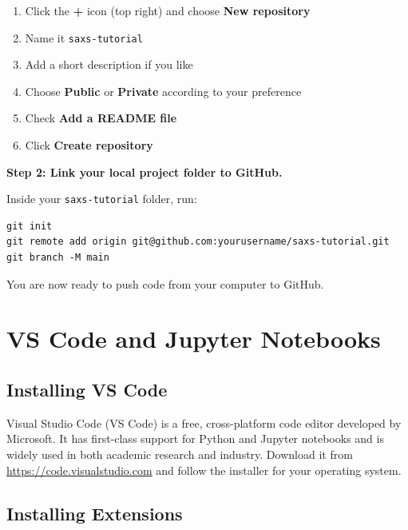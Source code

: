 \documentclass[nobib]{tufte-book}
\begin{document}
\begin{enumerate}
    \item Click the \textbf{+} icon (top right) and choose
          \textbf{New repository}
    \item Name it \texttt{saxs-tutorial}
    \item Add a short description if you like
    \item Choose \textbf{Public} or \textbf{Private} according to your
          preference
    \item Check \textbf{Add a README file}
    \item Click \textbf{Create repository}
\end{enumerate}

\medskip
\noindent\textbf{Step 2: Link your local project folder to GitHub.}

Inside your \texttt{saxs-tutorial} folder, run:

\begin{lstlisting}[style=bashstyle]
git init
git remote add origin git@github.com:yourusername/saxs-tutorial.git
git branch -M main
\end{lstlisting}

You are now ready to push code from your computer to GitHub.

\chapter{VS Code and Jupyter Notebooks}
\label{ch:vscode}

\section{Installing VS Code}

Visual Studio Code (VS Code) is a free, cross-platform code editor developed
by Microsoft.
It has first-class support for Python and Jupyter notebooks and is widely
used in both academic research and industry.
Download it from \url{https://code.visualstudio.com} and follow the
installer for your operating system.

\section{Installing Extensions}
\end{document}
